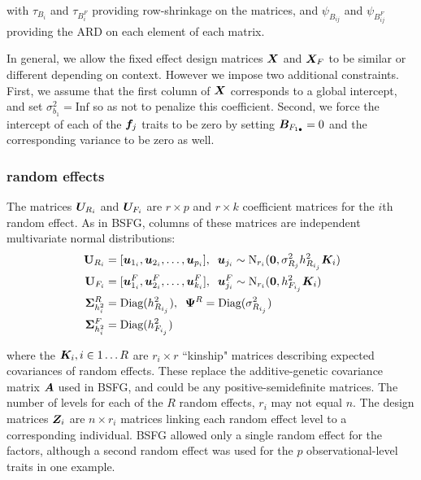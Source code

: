 \documentclass[11pt]{amsart}
\newcommand*{\B}[1]{\ifmmode\bm{#1}\else\textbf{#1}\fi}
\begin{document}
\noindent with $\tau_{B_i}$ and $\tau_{B^F_i}$ providing row-shrinkage on the matrices, and $\psi_{B_{ij}}$ and $\psi_{B^F_{ij}}$ providing the ARD on each element of each matrix.

In general, we allow the fixed effect design matrices $\B{X}$ and $\B{X}_F$ to be similar or different depending on context. 
However we impose two additional constraints. First, we assume that the first column of $\B{X}$ corresponds to a global intercept, and set $\sigma^2_{b_1} = \mbox{Inf}$ so as not to penalize this coefficient. 
Second, we force the intercept of each of the $\B{f}_j$ traits to be zero by setting $\B{B}_{F_{1\bullet}} = 0$ and the corresponding variance to be zero as well.

\subsubsection{random effects}
The matrices $\B{U}_{R_i}$ and $\B{U}_{F_i}$ are $r \times p$ and $r \times k$ coefficient matrices for the $i$th random effect. As in BSFG, columns of these matrices are independent multivariate normal distributions:
\begin{align} \begin{split}
\B{U}_{R_i} &= [\B{u}_{1_i}, \B{u}_{2_i},\dots,\B{u}_{p_i}],\;\; \B{u}_{j_i} \sim \mbox{N}_{r_i}(\B{0},\sigma^2_{R_j}h^2_{R_{i_j}}\B{K}_i) \\
\B{U}_{F_i} &=  [\B{u}^F_{1_i}, \B{u}^F_{2_i},\dots,\B{u}^F_{k_i}],\;\; \B{u}^F_{j_i} \sim \mbox{N}_{r_i}(\B{0},h^2_{F_{i_j}}\B{K}_i)\\
\;\B{\Sigma}^R_{h^2_i} &= \mbox{Diag}(h^2_{R_{i_j}}),\;\;\B{\Psi}^R = \mbox{Diag}(\sigma^2_{R_{i_j}}) \\
\;\B{\Sigma}^F_{h^2_i} &= \mbox{Diag}(h^2_{F_{i_j}})
\end{split} \end{align}

\noindent where the $\B{K}_i, i \in 1\dots R$ are $r_i \times r$ ``kinship" matrices describing expected covariances of random effects. These replace the additive-genetic covariance matrix $\B{A}$ used in BSFG, and could be any positive-semidefinite matrices. The number of levels for each of the $R$ random effects, $r_i$ may not equal $n$. The design matrices $\B{Z}_i$ are $n \times r_i$ matrices linking each random effect level to a corresponding individual. BSFG allowed only a single random effect for the factors, although a second random effect was used for the $p$ observational-level traits in one example. 
\end{document}

